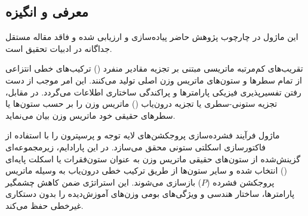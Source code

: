 \subsection{معرفی و انگیزه}
این ماژول در چارچوب پژوهش حاضر پیاده‌سازی و ارزیابی شده و فاقد مقاله مستقل جداگانه در ادبیات تحقیق است.

تقریب‌های کم‌مرتبه ماتریسی مبتنی بر تجزیه مقادیر منفرد () ترکیب‌های خطی انتزاعی از تمام سطرها و ستون‌های ماتریس وزن اصلی تولید می‌کنند. این امر موجب از دست رفتن تفسیرپذیری فیزیکی پارامترها و پراکندگی ساختاری اطلاعات می‌گردد. در مقابل، تجزیه ستونی-سطری یا تجزیه درون‌یاب () ماتریس وزن را بر حسب ستون‌ها یا سطرهای حقیقی خود ماتریس وزن بیان می‌نماید.

ماژول  فرآیند فشرده‌سازی پروجکشن‌های لایه توجه و پرسپترون را با استفاده از فاکتورسازی اسکلتی ستونی محقق می‌سازد. در این پارادایم، زیرمجموعه‌ای گزینش‌شده از ستون‌های حقیقی ماتریس وزن به عنوان ستون‌فقرات یا اسکلت پایه‌ای () انتخاب شده و سایر ستون‌ها از طریق ترکیب خطی درون‌یاب به وسیله ماتریس پروجکشن فشرده ($P$) بازسازی می‌شوند. این استراتژی ضمن کاهش چشمگیر پارامترها، ساختار هندسی و ویژگی‌های بومی وزن‌های آموزش‌دیده را بدون دستکاری غیرخطی حفظ می‌کند.
